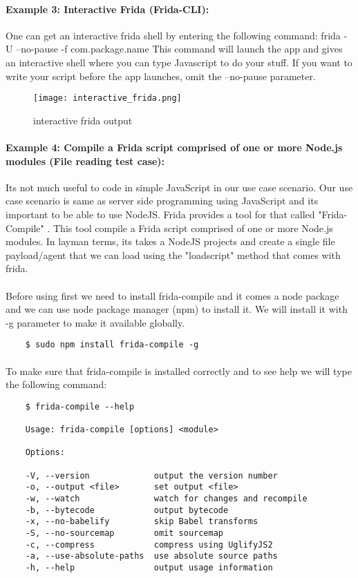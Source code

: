 \documentclass[../main.tex]{subfile}
\begin{document}
	
	\paragraph{Example 3: Interactive Frida (Frida-CLI):}
	One can get an interactive frida shell by entering the following command:
	frida -U --no-pause -f com.package.name
	This command will launch the app and gives an interactive shell where you can type Javascript to do your stuff. If you want to write your
	script before the app launches, omit the --no-pause parameter.
	\begin{figure}
		\texttt{[image: interactive\_frida.png]}
		\caption{interactive frida output }
		\label{fig:interactive_frida}
	\end{figure}

	\paragraph{Example 4: Compile a Frida script comprised of one or more Node.js modules (File reading test case):} Its not much useful to code in simple JavaScript in our use case scenario. Our use case scenario is same as server side programming using JavaScript and its important to be able to use NodeJS. Frida provides a tool for that called "Frida-Compile" \cite{frida_compile}. This tool compile a Frida script comprised of one or more Node.js modules. In layman terms, its takes a NodeJS projects and create a single file payload/agent that we can load using the "load\textunderscore script" method that comes with frida.
	\paragraph{} Before using first we need to install frida-compile and it comes a node package and we can use node package manager (npm) to install it. We will install it with -g parameter to make it available globally.
	\begin{lstlisting}
	$ sudo npm install frida-compile -g
	\end{lstlisting}
	
	
	\paragraph{} To make sure that frida-compile is installed correctly and to see help we will type the following command:
	\begin{lstlisting}
	$ frida-compile --help

	Usage: frida-compile [options] <module>
	
	Options:
	
	-V, --version             output the version number
	-o, --output <file>       set output <file>
	-w, --watch               watch for changes and recompile
	-b, --bytecode            output bytecode
	-x, --no-babelify         skip Babel transforms
	-S, --no-sourcemap        omit sourcemap
	-c, --compress            compress using UglifyJS2
	-a, --use-absolute-paths  use absolute source paths
	-h, --help                output usage information	

	\end{lstlisting}	
	
\end{document}
